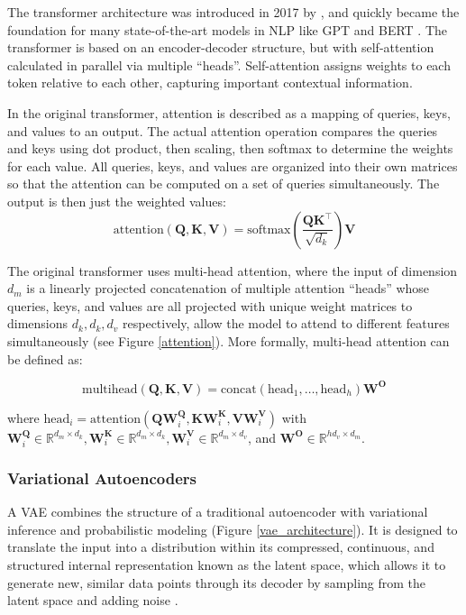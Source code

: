 \documentclass{article}
\begin{document}
The transformer architecture was introduced in 2017 by \citet{vaswani_attention_2017}, and quickly became the foundation for many state-of-the-art models in NLP like GPT \citep{radford_improving_2018} and BERT \citep{bert}. The transformer is based on an encoder-decoder structure, but with self-attention calculated in parallel via multiple ``heads''. Self-attention assigns weights to each token relative to each other, capturing important contextual information.

In the original transformer, attention is described as a mapping of queries, keys, and values to an output. The actual attention operation compares the queries and keys using dot product, then scaling, then softmax to determine the weights for each value. All queries, keys, and values are organized into their own matrices so that the attention can be computed on a set of queries simultaneously. The output is then just the weighted values:
\[\text{attention}(\mathbf{Q},\mathbf{K},\mathbf{V}) = \text{softmax}\left(\frac{\mathbf{QK}^\intercal}{\sqrt{d_k}}\right)\mathbf{V}\]

The original transformer uses multi-head attention, where the input of dimension \(d_m\) is a linearly projected concatenation of multiple attention ``heads'' whose queries, keys, and values are all projected with unique weight matrices to dimensions \(d_k, d_k, d_v\) respectively, allow the model to attend to different features simultaneously (see Figure \ref{attention}). More formally, multi-head attention can be defined as:

\[\text{multihead}(\mathbf{Q}, \mathbf{K}, \mathbf{V}) = \text{concat}(\text{head}_1, \dots, \text{head}_h)\mathbf{W^O}\] 

where \(\text{head}_i = \text{attention}(\mathbf{QW}_i^{\mathbf{Q}}, \mathbf{KW}_i^{\mathbf{K}}, \mathbf{VW}_i^{\mathbf{V}})\) with \(\mathbf{W}_i^{\mathbf{Q}} \in \mathbb{R}^{d_{m}\times d_k}, \mathbf{W}_i^{\mathbf{K}} \in \mathbb{R}^{d_{m}\times d_k}, \mathbf{W}_i^{\mathbf{V}} \in \mathbb{R}^{d_{m}\times d_v}\), and \(\mathbf{W^O} \in \mathbb{R}^{hd_{v}\times d_m}\).


\subsubsection{Variational Autoencoders}\label{VAE-sec}
A VAE combines the structure of a traditional autoencoder \citep{bank_autoencoders_2023} with variational inference and probabilistic modeling (Figure \ref{vae_architecture}). It is designed to translate the input into a distribution within its compressed, continuous, and structured internal representation known as the latent space, which allows it to generate new, similar data points through its decoder by sampling from the latent space and adding noise \citep{kingma_vae_2013}.
\end{document}
